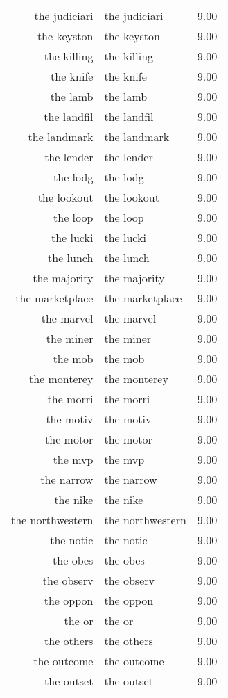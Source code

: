 \begin{table}[ht]
\begin{tabular}{rlr}
  the judiciari & the judiciari & 9.00 \\ 
  the keyston & the keyston & 9.00 \\ 
  the killing & the killing & 9.00 \\ 
  the knife & the knife & 9.00 \\ 
  the lamb & the lamb & 9.00 \\ 
  the landfil & the landfil & 9.00 \\ 
  the landmark & the landmark & 9.00 \\ 
  the lender & the lender & 9.00 \\ 
  the lodg & the lodg & 9.00 \\ 
  the lookout & the lookout & 9.00 \\ 
  the loop & the loop & 9.00 \\ 
  the lucki & the lucki & 9.00 \\ 
  the lunch & the lunch & 9.00 \\ 
  the majority & the majority & 9.00 \\ 
  the marketplace & the marketplace & 9.00 \\ 
  the marvel & the marvel & 9.00 \\ 
  the miner & the miner & 9.00 \\ 
  the mob & the mob & 9.00 \\ 
  the monterey & the monterey & 9.00 \\ 
  the morri & the morri & 9.00 \\ 
  the motiv & the motiv & 9.00 \\ 
  the motor & the motor & 9.00 \\ 
  the mvp & the mvp & 9.00 \\ 
  the narrow & the narrow & 9.00 \\ 
  the nike & the nike & 9.00 \\ 
  the northwestern & the northwestern & 9.00 \\ 
  the notic & the notic & 9.00 \\ 
  the obes & the obes & 9.00 \\ 
  the observ & the observ & 9.00 \\ 
  the oppon & the oppon & 9.00 \\ 
  the or & the or & 9.00 \\ 
  the others & the others & 9.00 \\ 
  the outcome & the outcome & 9.00 \\ 
  the outset & the outset & 9.00 \\ 

\end{tabular}
\end{table}
